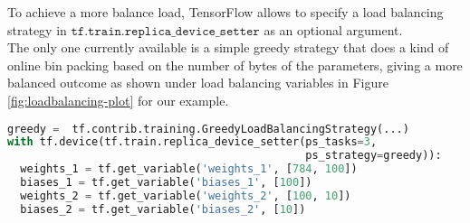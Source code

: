 To achieve a more balance load, TensorFlow allows to specify a load balancing strategy in $\texttt{tf.train.replica\_device\_setter}$ as an optional argument.\\
The only one currently available is a simple greedy strategy that does a kind of online bin packing based on the number of bytes of the parameters, giving a more balanced outcome as shown under load balancing variables in Figure \ref{fig:loadbalancing-plot} for our example.
\begin{lstlisting}[label=listing:greedy-loadbalance, language=Python, caption=Greedy load balancing variable placement with \texttt{replica\_device\_setter}.]
greedy =  tf.contrib.training.GreedyLoadBalancingStrategy(...)
with tf.device(tf.train.replica_device_setter(ps_tasks=3, 
                                              ps_strategy=greedy)):
  weights_1 = tf.get_variable('weights_1', [784, 100])
  biases_1 = tf.get_variable('biases_1', [100])
  weights_2 = tf.get_variable('weights_2', [100, 10])
  biases_2 = tf.get_variable('biases_2', [10])
\end{lstlisting}